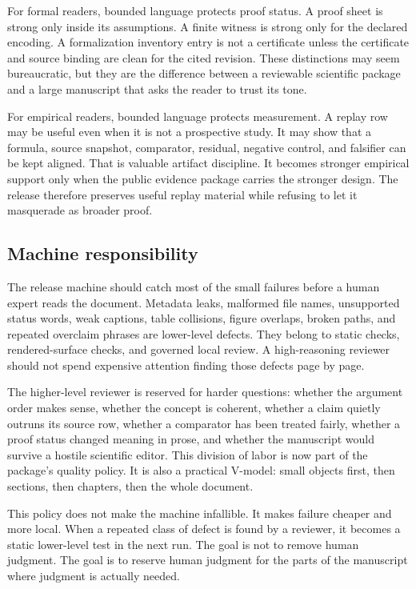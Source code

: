 For formal readers, bounded language protects proof status. A proof sheet is
strong only inside its assumptions. A finite witness is strong only for the
declared encoding. A formalization inventory entry is not a certificate unless
the certificate and source binding are clean for the cited revision. These
distinctions may seem bureaucratic, but they are the difference between a
reviewable scientific package and a large manuscript that asks the reader to
trust its tone.

For empirical readers, bounded language protects measurement. A replay row may
be useful even when it is not a prospective study. It may show that a formula,
source snapshot, comparator, residual, negative control, and falsifier can be
kept aligned. That is valuable artifact discipline. It becomes stronger
empirical support only when the public evidence package carries the stronger
design. The release therefore preserves useful replay material while refusing
to let it masquerade as broader proof.

\subsection{Machine responsibility}

The release machine should catch most of the small failures before a human
expert reads the document. Metadata leaks, malformed file names, unsupported
status words, weak captions, table collisions, figure overlaps, broken paths,
and repeated overclaim phrases are lower-level defects. They belong to static
checks, rendered-surface checks, and governed local review. A high-reasoning
reviewer should not spend expensive attention finding those defects page by
page.

The higher-level reviewer is reserved for harder questions: whether the
argument order makes sense, whether the concept is coherent, whether a claim
quietly outruns its source row, whether a comparator has been treated fairly,
whether a proof status changed meaning in prose, and whether the manuscript
would survive a hostile scientific editor. This division of labor is now part
of the package's quality policy. It is also a practical V-model: small objects
first, then sections, then chapters, then the whole document.

This policy does not make the machine infallible. It makes failure cheaper and
more local. When a repeated class of defect is found by a reviewer, it becomes
a static lower-level test in the next run. The goal is not to remove human
judgment. The goal is to reserve human judgment for the parts of the manuscript
where judgment is actually needed.

